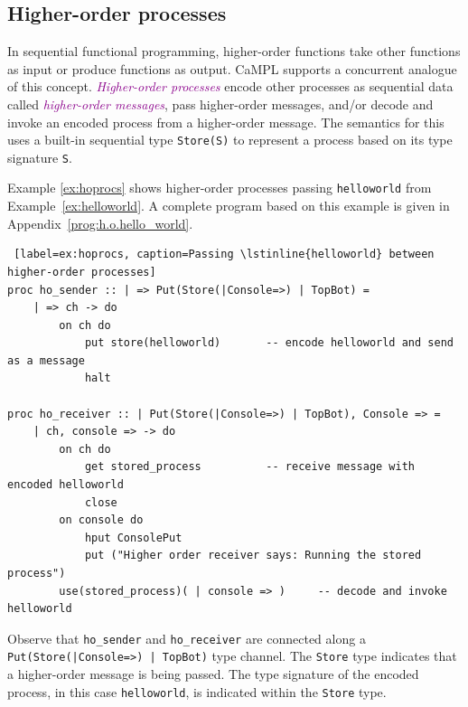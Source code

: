 \documentclass[acmsmall]{acmart}
\newcommand{\tc}[1]{\textcolor{darkMagenta}{\textit{#1}}}
\begin{document}
\subsection{Higher-order processes}
\label{sec:homsgs}

In sequential functional programming, higher-order functions take other functions as input or produce functions as output. 
CaMPL supports a concurrent analogue of this concept. 
\tc{Higher-order processes} 
encode other processes as sequential data called \tc{higher-order messages}, pass higher-order messages, and/or decode and invoke an encoded process from a higher-order message.
The semantics for this uses a built-in sequential type \lstinline$Store(S)$ to represent a process based on its type signature \lstinline$S$.

Example \ref{ex:hoprocs} shows higher-order processes passing \lstinline$helloworld$ from Example~\ref{ex:helloworld}. 
A complete program based on this example is given in Appendix~\ref{prog:h.o.hello_world}.
\begin{lstlisting} [label=ex:hoprocs, caption=Passing \lstinline{helloworld} between higher-order processes]
proc ho_sender :: | => Put(Store(|Console=>) | TopBot) =
	| => ch -> do
		on ch do
			put store(helloworld)		-- encode helloworld and send as a message
			halt
			
proc ho_receiver :: | Put(Store(|Console=>) | TopBot), Console => =
	| ch, console => -> do
		on ch do
			get stored_process			-- receive message with encoded helloworld
			close
		on console do
			hput ConsolePut
			put ("Higher order receiver says: Running the stored process")
		use(stored_process)( | console => )		-- decode and invoke helloworld
\end{lstlisting}
Observe that \lstinline$ho_sender$ and \lstinline$ho_receiver$ are connected along a \lstinline$Put(Store(|Console=>) | TopBot)$ type channel.
The \lstinline$Store$ type indicates that a higher-order message is being passed.
The type signature of the encoded process, in this case \lstinline$helloworld$, is indicated within the \lstinline$Store$ type.
\end{document}
